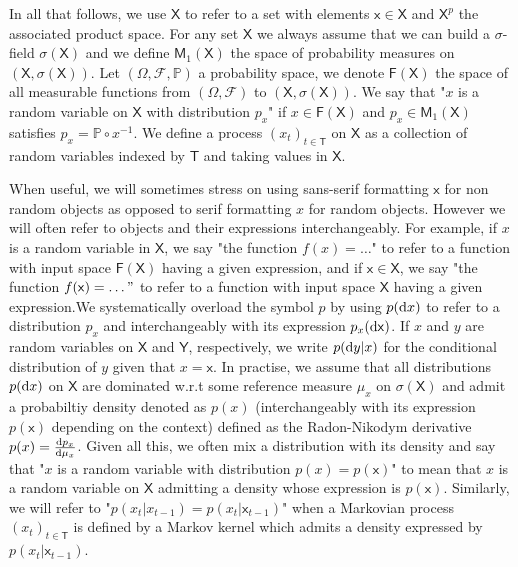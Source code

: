 \documentclass{article}
\begin{document}
In all that follows, we use $\mathsf{X}$ to refer to a set with elements $\mathsf{x} \in \mathsf{X}$ and $\mathsf{X}^p$ the associated product space.  For any set $\mathsf{X}$ we always assume that we can build a $\sigma$-field $\sigma(\mathsf{X})$ and we define $\mathsf{M}_1(\mathsf{X})$ the space of probability measures on $(\mathsf{X},\sigma(\mathsf{X}))$. Let $(\mathsf{\Omega},\mathcal{F},\mathbb{P})$ a probability space, we denote $\mathsf{F(X)}$ the space of all measurable functions from $(\mathsf{\Omega},\mathcal{F})$ to $(\mathsf{X},\sigma(\mathsf{X}))$. We say that "$x$ is a random variable on $\mathsf{X}$ with distribution $p_x$" if $x \in \mathsf{F(X)}$ and $p_x \in \mathsf{M}_1(\mathsf{X})$ satisfies $p_x = \mathbb{P} \circ x^{-1}$.  We define a process $(x_t)_{t \in \mathsf{T}}$ on $\mathsf{X}$ as a collection of random variables indexed by $\mathsf{T}$ and taking values in $\mathsf{X}$. 

When useful, we will sometimes stress on using sans-serif formatting $\mathsf{x}$ for non random objects as opposed to serif formatting $x$ for random objects. However we will often refer to objects and their expressions interchangeably. For example, if $x$ is a random variable in $\mathsf{X}$, we say "the function $f(x) = \ldots $" to refer to a function with input space $\mathsf{F(X)}$ having a given expression, and if $\mathsf{x} \in \mathsf{X}$, we say "the function $f(\mathsf{x}) = \ldots"$ to refer to a function with input space $\mathsf{X}$ having a given expression.We systematically overload the symbol $p$ by using $p(\mathrm{d} x)$ to refer to a distribution $p_x$ and interchangeably with its expression $p_x(\mathsf{\mathrm{d} x})$. If $x$ and $y$ are random variables on $\mathsf{X}$ and $\mathsf{Y}$, respectively, we write $p(\mathrm{d} y|x)$ for the conditional distribution of $y$ given that $x = \mathsf{x}$. In practise, we assume that all distributions $p(\mathrm{d} x)$ on $\mathsf{X}$ are dominated w.r.t some reference measure $\mu_x$ on $\sigma(\mathsf{X})$ and admit a probabiltiy density denoted as $p(x)$ (interchangeably with its expression $p(\mathsf{x})$ depending on the context) defined as the Radon-Nikodym derivative $p(x) = \frac{\mathrm{d} p_x}{\mathrm{d} \mu_x}$. Given all this, we often mix a distribution with its density and say that "$x$ is a random variable with distribution $p(x) = p(\mathsf{x})$" to mean that $x$ is a random variable on $\mathsf{X}$ admitting a density whose expression is $p(\mathsf{x})$. Similarly, we will refer to "$p(x_t|x_{t-1}) = p(x_t|\mathsf{x}_{t-1})$" when a Markovian process $(x_t)_{t \in \mathsf{T}}$ is defined by a Markov kernel which admits a density expressed by $p(x_t|\mathsf{x}_{t-1})$.
\end{document}
